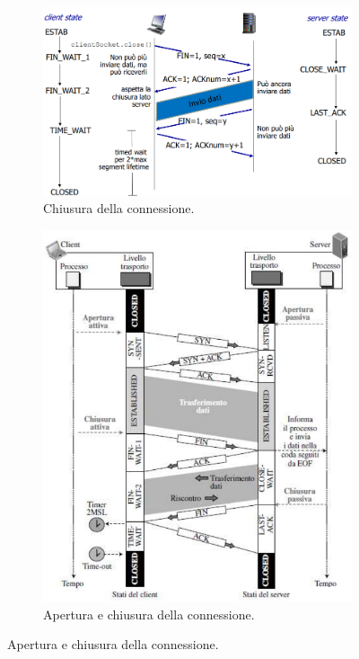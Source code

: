 \documentclass[11pt, italian, openany]{book}
\begin{document}
\begin{sloppypar}
\begin{itemize}[topsep=0pt]
\begin{itemize}
	\end{itemize}

	\begin{figure}[h!]
		\begin{subfigure}{0.49 \linewidth} \centering
			\includegraphics[scale=0.28]{images/tcp-chiusura.png}
			\caption{Chiusura della connessione.}
		\end{subfigure}
		\begin{subfigure}{0.49 \linewidth} \centering
			\includegraphics[scale=0.35]{images/tcp-apertura-chiusura.png}
			\caption{Apertura e chiusura della connessione.}
		\end{subfigure}
	\end{figure}


\end{itemize}
\end{sloppypar}
\end{document}
